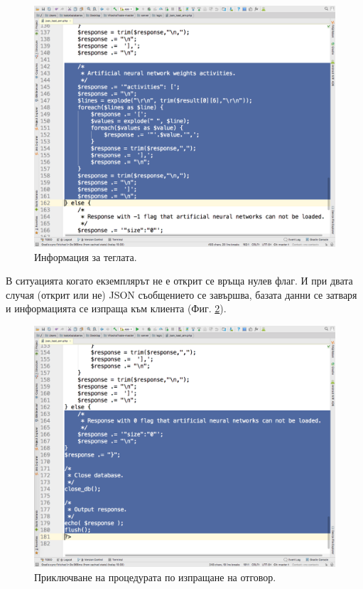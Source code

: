\documentclass[book,14pt,oneside,openany]{memoir}
\begin{document}
\begin{figure}[h]
  \centering
  \includegraphics[height=0.45\pdfpageheight]{pic0120}
  \caption{Информация за теглата.}
\label{fig:pic0120}
\end{figure}
\FloatBarrier

В ситуацията когато екземплярът не е открит се връща нулев флаг. И при двата случая (открит или не) JSON съобщението се завършва, базата данни се затваря и информацията се изпраща към клиента (Фиг. \ref{fig:pic0121}).

\begin{figure}[h]
  \centering
  \includegraphics[height=0.45\pdfpageheight]{pic0121}
  \caption{Приключване на процедурата по изпращане на отговор.}
\label{fig:pic0121}
\end{figure}
\FloatBarrier
\end{document}
